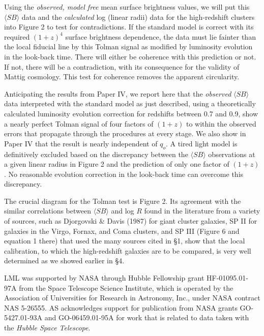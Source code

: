 \documentclass[preprint]{aastex}
\begin{document}
Using the {\it observed, model free} mean surface brightness values,
we will put this $\langle SB \rangle$ data and the {\it calculated}
log (linear radii) data for the high-redshift clusters into Figure 2
to test for contradictions. If the standard model is correct with its
required $(1 + z)^4$ surface brightness dependence, the data must lie
fainter than the local fiducial line by this Tolman signal as modified
by luminosity evolution in the look-back time.  There will either be
coherence with this prediction or not. If not, there will be a
contradiction, with its consequence for the validity of Mattig
cosmology. This test for coherence removes the apparent circularity.

Anticipating the results from Paper IV, we report here that the {\it
observed} $\langle SB \rangle$ data interpreted with the standard
model as just described, using a theoretically calculated luminosity
evolution correction for redshifts between 0.7 and 0.9, show a nearly
perfect Tolman signal of four factors of $(1 + z)$ to within the
observed errors that propagate through the procedures at every
stage. We also show in Paper IV that the result is nearly independent
of $q_o$.  A tired light model is definitively excluded based on the
discrepancy between the $\langle SB \rangle$ observations at a given
linear radius in Figure 2 and the prediction of only one factor of $(1
+ z)$. No reasonable evolution correction in the look-back time can
overcome this discrepancy.

The crucial diagram for the Tolman test is Figure 2. Its agreement
with the similar correlations between $\langle SB \rangle$ and log $R$
found in the literature from a variety of sources, such as Djorgovski
\& Davis (1987) for giant cluster galaxies, SP II for galaxies in the
Virgo, Fornax, and Coma clusters, and SP III (Figure 6 and equation 1
there) that used the many sources cited in \S 1, show that the local
calibration, to which the high-redshift galaxies are to be compared,
is very well determined as we showed earlier in \S 4.

\acknowledgments 

LML was supported by NASA through Hubble Fellowship grant
HF-01095.01-97A from the Space Telescope Science Institute, which is
operated by the Association of Universities for Research in Astronomy,
Inc., under NASA contract NAS 5-26555. AS acknowledges support for
publication from NASA grants GO-5427.01-93A and GO-06459.01-95A for
work that is related to data taken with the {\it Hubble Space
Telescope}.
\end{document}
